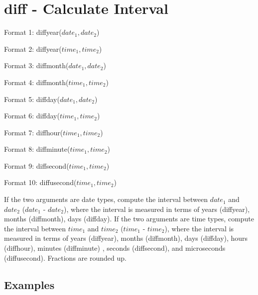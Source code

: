 
%

\section{diff - Calculate Interval\label{sect:diff}}

Format 1: diffyear($date_1,date_2$)

Format 2: diffyear($time_1,time_2$)

Format 3: diffmonth($date_1,date_2$)

Format 4: diffmonth($time_1,time_2$)

Format 5: diffday($date_1,date_2$)

Format 6: diffday($time_1,time_2$)

Format 7: diffhour($time_1,time_2$)

Format 8: diffminute($time_1,time_2$)

Format 9: diffsecond($time_1,time_2$)

Format 10: diffusecond($time_1,time_2$)

If the two arguments are date types, compute the interval between $date_1$ and $date_2$ ($date_1$ - $date_2$), where the interval is measured in terms of years (diffyear), months (diffmonth), days (diffday). 
If the two arguments are time types, compute the interval between $time_1$ and $time_2$ ($time_1$ - $time_2$), where the interval is measured in terms of years (diffyear), months (diffmonth), days (diffday), hours (diffhour), minutes (diffminute) , seconds (diffsecond), and microseconds (diffusecond).
Fractions are rounded up.

\subsection*{Examples}


%


